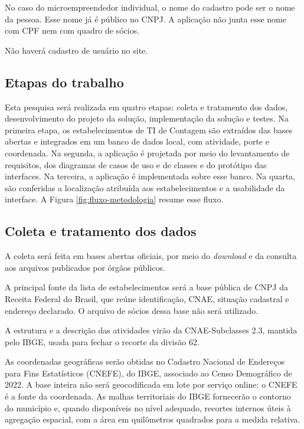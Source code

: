 No caso do microempreendedor individual, o nome do cadastro pode ser o nome da pessoa.
Esse nome já é público no CNPJ.
A aplicação não junta esse nome com CPF nem com quadro de sócios.

Não haverá cadastro de usuário no site.

\subsection{Etapas do trabalho}

Esta pesquisa será realizada em quatro etapas: coleta e tratamento dos dados, desenvolvimento do projeto da solução, implementação da solução e testes.
Na primeira etapa, os estabelecimentos de TI de Contagem são extraídos das bases abertas e integrados em um banco de dados local, com atividade, porte e coordenada.
Na segunda, a aplicação é projetada por meio do levantamento de requisitos, dos diagramas de casos de uso e de classes e do protótipo das interfaces.
Na terceira, a aplicação é implementada sobre esse banco.
Na quarta, são conferidas a localização atribuída aos estabelecimentos e a usabilidade da interface.
A Figura \ref{fig:fluxo-metodologia} resume esse fluxo.



\subsection{Coleta e tratamento dos dados}
\label{subsec:coleta}

A coleta será feita em bases abertas oficiais, por meio do \textit{download} e da consulta aos arquivos publicados por órgãos públicos.

A principal fonte da lista de estabelecimentos será a base pública de CNPJ da Receita Federal do Brasil, que reúne identificação, CNAE, situação cadastral e endereço declarado.
O arquivo de sócios dessa base não será utilizado.

A estrutura e a descrição das atividades virão da CNAE-Subclasses 2.3, mantida pelo IBGE, usada para fechar o recorte da divisão 62.

As coordenadas geográficas serão obtidas no Cadastro Nacional de Endereços para Fins Estatísticos (CNEFE), do IBGE, associado ao Censo Demográfico de 2022.
A base inteira não será geocodificada em lote por serviço online: o CNEFE é a fonte da coordenada.
As malhas territoriais do IBGE fornecerão o contorno do município e, quando disponíveis no nível adequado, recortes internos úteis à agregação espacial, com a área em quilômetros quadrados para a medida relativa.

